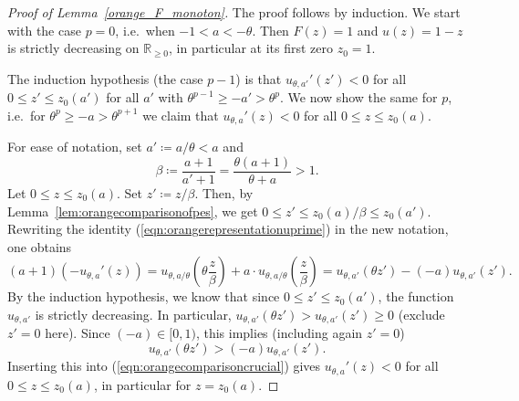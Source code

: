 \documentclass[12pt]{article}
\newcommand{\R}{\mathbb{R}} %
\newcommand{\1}{\mathds{1}}
\theoremstyle{definition}
\theoremstyle{plain}
\theoremstyle{remark}
\begin{document}
    \begin{proof}[Proof of Lemma~\ref{orange_F_monoton}]
    The proof follows by induction. We start with the case $p=0$, i.e.\ when $-1<a<-\theta$. Then $F(z)=1$ and $u(z)=1-z$ is strictly decreasing on $\R_{\ge0}$, in particular at its first zero $z_0=1$.

The induction hypothesis (the case $p-1$) is that $u_{\theta,a'}'(z')<0$ for all $0\leq z'\leq z_0(a')$ for all $a'$ with $\theta^{p-1}\geq -a'>\theta^p$. We now show the same for $p$, i.e.\ for $\theta^p \geq -a>\theta^{p+1}$ we claim that $u_{\theta,a}'(z)<0$ for all $0\leq z\leq z_0(a)$.

For ease of notation, set $a'\coloneqq a/\theta<a$ and
$$
\beta \coloneqq \frac{a+1}{a'+1} = \frac{\theta (a+1)}{\theta+a}>1.
$$
Let $0\leq z\leq z_0(a)$. Set $z'\coloneqq z/\beta$. Then, by Lemma~\ref{lem:orangecomparisonofpes}, we get $0\leq z'\leq z_0(a)/\beta\leq  z_0(a')$. Rewriting the identity (\ref{eqn:orangerepresentationuprime}) in the new notation, one obtains
\begin{equation} \label{eqn:orangecomparisoncrucial}
(a+1)(-u_{\theta,a}'(z)) = u_{\theta,a/\theta}\left( \theta \frac{z}{\beta} \right)+ a \cdot u_{\theta,a/\theta}\left( \frac{z}{\beta} \right) = u_{\theta,a'}\left(  \theta z'  \right)- (-a) u_{\theta,a'}\left( z' \right).
\end{equation} 
By the induction hypothesis, we know that since $0\leq z'\leq z_0(a')$, the function $u_{\theta,a'}$ is strictly decreasing. In particular, $u_{\theta,a'}\left(  \theta z'  \right)>u_{\theta,a'}\left( z' \right)\geq 0$ (exclude $z'=0$ here). Since $(-a)\in[0,1)$, this implies (including again $z'=0$)
$$
u_{\theta,a'}\left(  \theta z'  \right)>(-a)u_{\theta,a'}\left( z' \right).
$$
Inserting this into (\ref{eqn:orangecomparisoncrucial}) gives $u_{\theta,a}'(z)<0$ for all $0\leq z\leq z_0(a)$, in particular for $z=z_0(a)$.
    \end{proof}
\end{document}
